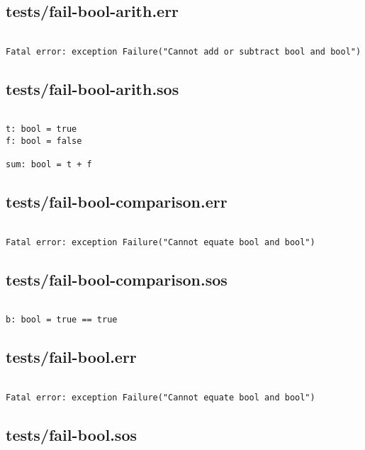 \documentclass[main.tex]{subfiles}
\begin{document}
\subsection{tests/fail-bool-arith.err}

\begin{lstlisting}

Fatal error: exception Failure("Cannot add or subtract bool and bool")
\end{lstlisting}

\subsection{tests/fail-bool-arith.sos}

\begin{lstlisting}

t: bool = true
f: bool = false

sum: bool = t + f
\end{lstlisting}

\subsection{tests/fail-bool-comparison.err}

\begin{lstlisting}

Fatal error: exception Failure("Cannot equate bool and bool")
\end{lstlisting}

\subsection{tests/fail-bool-comparison.sos}

\begin{lstlisting}

b: bool = true == true
\end{lstlisting}

\subsection{tests/fail-bool.err}

\begin{lstlisting}

Fatal error: exception Failure("Cannot equate bool and bool")
\end{lstlisting}

\subsection{tests/fail-bool.sos}
\end{document}

